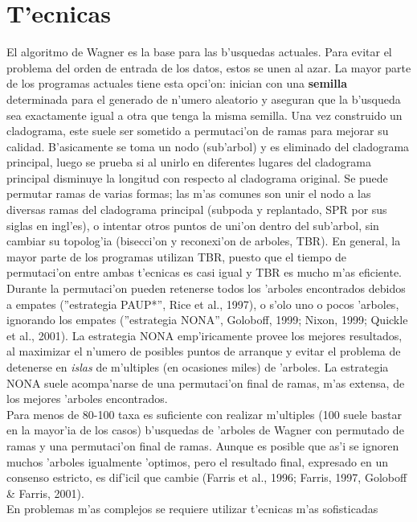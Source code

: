 \section{T'ecnicas}
El algoritmo de Wagner es la base para las b'usquedas actuales. Para evitar el
problema del orden de entrada de los datos, estos se unen al azar. La mayor
parte de los programas actuales tiene esta opci'on: inician con una
\textbf{semilla} determinada para el generado de n'umero aleatorio y aseguran
que la b'usqueda sea exactamente igual a otra que tenga la misma semilla. Una
vez construido un cladograma, este suele ser sometido a permutaci'on de ramas
para mejorar su calidad. B'asicamente se toma un nodo (sub'arbol) y es eliminado
del cladograma principal, luego se prueba si al unirlo en diferentes lugares del
cladograma principal disminuye la longitud con respecto al cladograma original.
Se puede permutar ramas de varias formas; las m'as comunes son unir el nodo a
las diversas ramas del cladograma principal (subpoda y replantado, SPR por sus
siglas en ingl'es), o intentar otros puntos de uni'on
dentro del sub'arbol, sin cambiar su topolog'ia (bisecci'on y reconexi'on de
arboles, TBR). En general, la mayor parte de los programas utilizan
TBR, puesto que el tiempo de permutaci'on entre ambas
t'ecnicas es casi igual y TBR es mucho m'as eficiente.\\
Durante la permutaci'on pueden retenerse todos los 'arboles encontrados debidos
a empates (''estrategia PAUP*'', Rice et al., 1997), o s'olo uno o pocos
'arboles, ignorando los empates (''estrategia NONA'', Goloboff, 1999; Nixon,
1999; Quickle et al., 2001). La estrategia NONA emp'iricamente provee los
mejores resultados, al maximizar el n'umero de posibles puntos de arranque y
evitar el problema de detenerse en \emph{islas} de m'ultiples (en ocasiones
miles) de 'arboles. La estrategia NONA suele acompa'narse de una permutaci'on
final de ramas, m'as extensa, de los mejores 'arboles encontrados.\\
Para menos de 80-100 taxa es suficiente con  realizar m'ultiples (100 suele
bastar en la mayor'ia de los casos) b'usquedas de 'arboles de Wagner con
permutado de ramas y una permutaci'on final de ramas. Aunque es posible que as'i
se ignoren muchos 'arboles igualmente 'optimos, pero el resultado final,
expresado en un consenso estricto, es dif'icil que cambie (Farris et al., 1996;
Farris, 1997, Goloboff \& Farris, 2001).\\
En problemas m'as complejos se requiere utilizar t'ecnicas m'as sofisticadas
